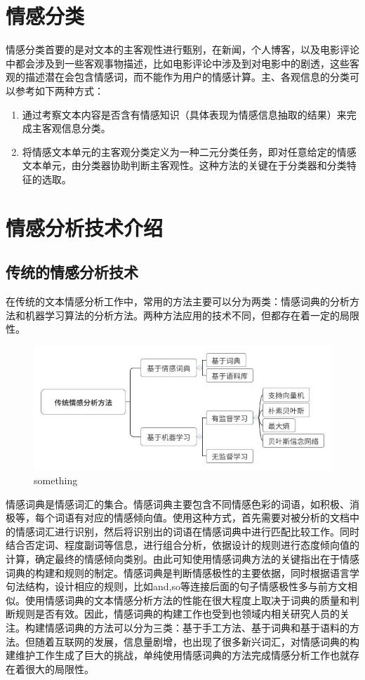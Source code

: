 \documentclass{clv3}
\begin{document}
\section{情感分类} 
情感分类首要的是对文本的主客观性进行甄别，在新闻，个人博客，以及电影评论中都会涉及到一些客观事物描述，比如电影评论中涉及到对电影中的剧透，这些客观的描述潜在会包含情感词，而不能作为用户的情感计算。主、各观信息的分类可以参考如下两种方式：
\begin{enumerate}[(1)]
	\item 通过考察文本内容是否含有情感知识（具体表现为情感信息抽取的结果）来完成主客观信息分类。
	\item 将情感文本单元的主客观分类定义为一种二元分类任务，即对任意给定的情感文本单元，由分类器协助判断主客观性。这种方法的关键在于分类器和分类特征的选取。
\end{enumerate}

\section{情感分析技术介绍}
\subsection{传统的情感分析技术}
在传统的文本情感分析工作中，常用的方法主要可以分为两类：情感词典的分析方法和机器学习算法的分析方法。两种方法应用的技术不同，但都存在着一定的局限性。

\begin{figure}[htbp]
\begin{center}
	\includegraphics[width=\linewidth]{传统情感分析方法.jpg}
	\caption{something}\label{fig:1}
\end{center}
\end{figure}

情感词典是情感词汇的集合。情感词典主要包含不同情感色彩的词语，如积极、消极等，每个词语有对应的情感倾向值。使用这种方式，首先需要对被分析的文档中的情感词汇进行识别，然后将识别出的词语在情感词典中进行匹配比较工作。同时结合否定词、程度副词等信息，进行组合分析，依据设计的规则进行态度倾向值的计算，确定最终的情感倾向类别。由此可知使用情感词典方法的关键指出在于情感词典的构建和规则的制定。情感词典是判断情感极性的主要依据，同时根据语言学句法结构，设计相应的规则，比如and,so等连接后面的句子情感极性多与前方文相似。使用情感词典的文本情感分析方法的性能在很大程度上取决于词典的质量和判断规则是否有效。因此，情感词典的构建工作也受到也领域内相关研究人员的关注。构建情感词典的方法可以分为三类：基于手工方法、基于词典和基于语料的方法。但随着互联网的发展，信息量剧增，也出现了很多新兴词汇，对情感词典的构建维护工作生成了巨大的挑战，单纯使用情感词典的方法完成情感分析工作也就存在着很大的局限性。
\end{document}

